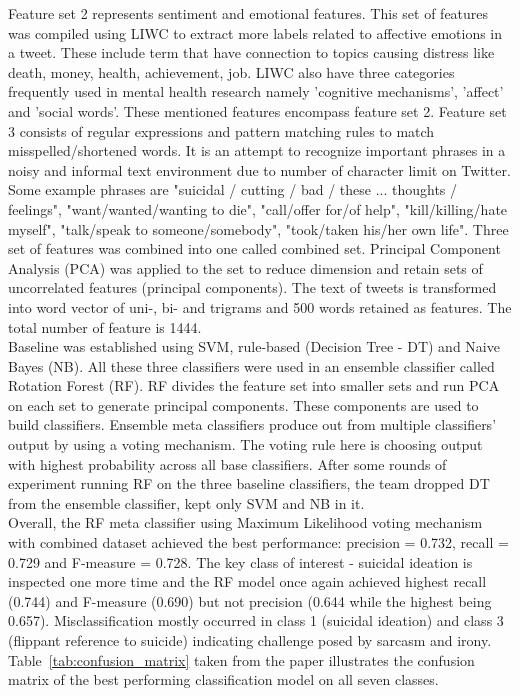 Feature set 2 represents sentiment and emotional features. This set of features was compiled using LIWC to extract more labels related to affective emotions in a tweet. These include term that have connection to topics causing distress like death, money, health, achievement, job. LIWC also have three categories frequently used in mental health research namely 'cognitive mechanisms', 'affect' and 'social words'. These mentioned features encompass feature set 2. Feature set 3 consists of regular expressions and pattern matching rules to match misspelled/shortened words. It is an attempt to recognize important phrases in a noisy and informal text environment due to number of character limit on Twitter. Some example phrases are "suicidal / cutting / bad / these ... thoughts / feelings", "want/wanted/wanting to die", "call/offer for/of help", "kill/killing/hate myself", "talk/speak to someone/somebody", "took/taken his/her own life". 
Three set of features was combined into one called combined set. Principal Component Analysis (PCA) was applied to the set to reduce dimension and retain sets of uncorrelated features (principal components). The text of tweets is transformed into word vector of uni-, bi- and trigrams and 500 words retained as features. The total number of feature is 1444.\\
Baseline was established using SVM, rule-based (Decision Tree - DT) and Naive Bayes (NB). All these three classifiers were used in an ensemble classifier called Rotation Forest (RF). RF divides the feature set into smaller sets and run PCA on each set to generate principal components. These components are used to build classifiers. Ensemble meta classifiers produce out from multiple classifiers' output by using a voting mechanism. The voting rule here is choosing output with highest probability across all base classifiers. After some rounds of experiment running RF on the three baseline classifiers, the team dropped DT from the ensemble classifier, kept only SVM and NB in it.\\
Overall, the RF meta classifier using Maximum Likelihood voting mechanism with combined dataset achieved the best performance: precision = 0.732, recall = 0.729 and F-measure = 0.728. The key class of interest - suicidal ideation is inspected one more time and the RF model once again achieved highest recall (0.744) and F-measure (0.690) but not precision (0.644 while the highest being 0.657). Misclassification mostly occurred in class 1 (suicidal ideation) and class 3 (flippant reference to suicide) indicating challenge posed by sarcasm and irony. Table~\ref{tab:confusion_matrix} taken from the paper \cite{Burnap2015} illustrates the confusion matrix of the best performing classification model on all seven classes.  
